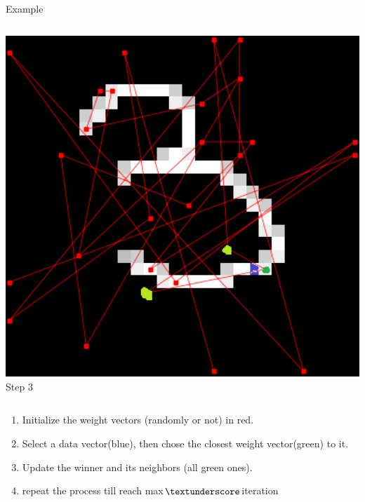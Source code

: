 \documentclass{beamer}
\begin{document}
\begin{frame}{Example}
\begin{columns}
    
			\begin{column}{0.33\textwidth}
      
				\centering
      				\includegraphics[width=1\textwidth]{pics/algo_1_3.png}
Step 3
    			\end{column}
		\end{columns}




               	\begin{enumerate}

                        \item Initialize the weight vectors (randomly or not) in red.
                        \item Select a data vector(blue), then chose the closest weight vector(green) to it.
                        \item Update the winner and its neighbors (all green ones).
                        \item repeat the process till reach max$\textunderscore$iteration
                \end{enumerate}
        \end{frame}
\end{document}

